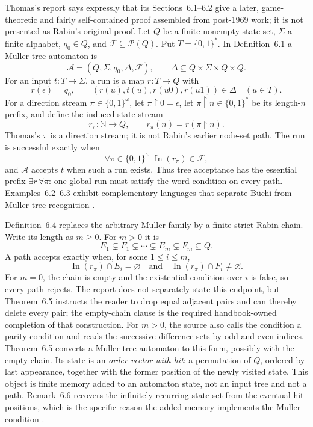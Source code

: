 Thomas's report says expressly that its Sections~6.1--6.2 give a later,
game-theoretic and fairly self-contained proof assembled from post-1969 work;
it is not presented as Rabin's original proof.  Let \(Q\) be a finite nonempty
state set, \(\Sigma\) a finite alphabet, \(q_0\in Q\), and
\(\mathcal F\subseteq\mathcal P(Q)\).  Put \(T=\{0,1\}^*\).  In
Definition~6.1 a Muller tree automaton is
\[
 \mathcal A=(Q,\Sigma,q_0,\Delta,\mathcal F),
 \qquad
 \Delta\subseteq Q\times\Sigma\times Q\times Q.
\]
For an input \(t:T\to\Sigma\), a run is a map \(r:T\to Q\) with
\[
 r(\epsilon)=q_0,
 \qquad
 (r(u),t(u),r(u0),r(u1))\in\Delta
 \quad(u\in T).
\]
For a direction stream \(\pi\in\{0,1\}^\omega\), let
\(\pi\mathbin{\upharpoonright}0=\epsilon\), let
\(\pi\mathbin{\upharpoonright}n\in\{0,1\}^*\) be its length-\(n\) prefix, and
define the induced state stream
\[
 r_\pi:\mathbb N\longrightarrow Q,
 \qquad
 r_\pi(n)=r(\pi\mathbin{\upharpoonright}n).
\]
Thomas's \(\pi\) is a direction stream; it is not Rabin's earlier node-set
path.  The run is successful exactly when
\[
 \forall\pi\in\{0,1\}^\omega\;
   \operatorname{In}(r_\pi)\in\mathcal F,
\]
and \(\mathcal A\) accepts \(t\) when such a run exists.  Thus tree acceptance
has the essential prefix \(\exists r\,\forall\pi\): one global run must satisfy
the word condition on every path.  Examples~6.2--6.3 exhibit complementary
languages that separate B\"uchi from Muller tree recognition
\cite[pp.~43--45]{Thomas1996Report}.

Definition~6.4 replaces the arbitrary Muller family by a finite strict Rabin
chain.  Write its length as \(m\geq0\).  For \(m>0\) it is
\[
 E_1\subsetneq F_1\subsetneq\cdots
   \subsetneq E_m\subsetneq F_m\subseteq Q.
\]
A path accepts exactly when, for some \(1\leq i\leq m\),
\[
 \operatorname{In}(r_\pi)\cap E_i=\varnothing
 \quad\text{and}\quad
 \operatorname{In}(r_\pi)\cap F_i\neq\varnothing.
\]
For \(m=0\), the chain is empty and the existential condition over \(i\) is
false, so every path rejects.  The report does not separately state this
endpoint, but Theorem~6.5 instructs the reader to drop equal adjacent pairs and
can thereby delete every pair; the empty-chain clause is the required
handbook-owned completion of that construction.  For \(m>0\), the source also
calls the condition a parity condition and reads the successive difference
sets by odd and even indices.  Theorem~6.5 converts a Muller tree automaton to
this form, possibly with the empty chain.  Its state is an \emph{order-vector with hit}: a
permutation of \(Q\), ordered by last appearance, together with the former
position of the newly visited state.  This object is finite memory added to an
automaton state, not an input tree and not a path.  Remark~6.6 recovers the
infinitely recurring state set from the eventual hit positions, which is the
specific reason the added memory implements the Muller condition
\cite[pp.~45--47]{Thomas1996Report}.

